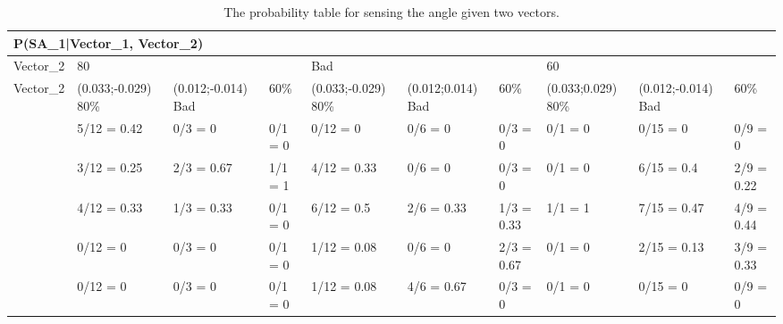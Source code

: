 \begin{table}[H]
\centering
\begin{tabular}{|l|l|l|l|l|l|l|l|l|l|}
\hline
\multicolumn{10}{|l|}{P(SA\_1|Vector\_1, Vector\_2)} \\\hline 
Vector\_2 & \multicolumn{3}{l|}{80} & \multicolumn{3}{l|}{Bad} &
\multicolumn{3}{l|}{60}\\\hline 
Vector\_2 & (0.033;-0.029) 80\% & (0.012;-0.014) Bad & 60\% &(0.033;-0.029) 80\%
& (0.012;0.014) Bad & 60\% & (0.033;0.029) 80\% & (0.012;-0.014) Bad & 60\% \\
\hline
[-30 - 0] & 5/12 = 0.42  & 0/3 = 0 & 0/1 = 0 & 0/12 = 0 & 0/6 = 0 & 0/3 = 0 &
0/1 = 0 & 0/15 = 0 & 0/9 = 0 \\ \hline
[0 - 30] & 3/12 = 0.25 & 2/3 = 0.67 & 1/1 = 1 & 4/12 = 0.33 & 0/6 = 0 & 0/3 = 0
& 0/1 = 0 & 6/15 = 0.4 & 2/9 = 0.22 \\ \hline
[30 - 60] & 4/12 = 0.33 & 1/3 = 0.33 & 0/1 = 0 & 6/12 = 0.5 & 2/6 = 0.33 & 1/3 =
0.33 & 1/1 = 1 & 7/15 = 0.47 & 4/9 = 0.44 \\ \hline
[60 - 90] & 0/12 = 0 & 0/3 = 0 & 0/1 = 0 & 1/12 = 0.08 & 0/6 = 0 & 2/3 = 0.67 &
0/1 = 0 & 2/15 = 0.13 & 3/9 = 0.33 \\ \hline
[90 - 330] & 0/12 = 0 & 0/3 = 0 & 0/1 = 0 & 1/12 = 0.08 & 4/6 = 0.67 & 0/3 = 0 &
0/1 = 0 & 0/15 = 0 & 0/9 = 0 \\ \hline
\end{tabular}
\caption{The probability table for sensing the angle given two vectors.}
\label{SDtable2}
\end{table}


